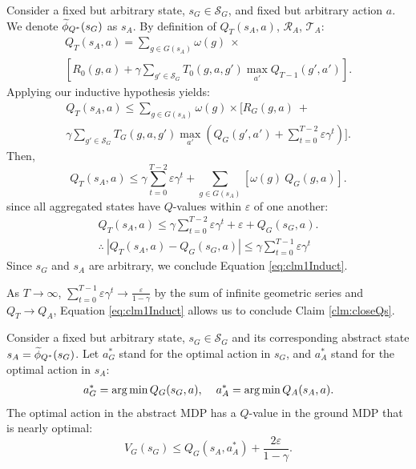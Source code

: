 Consider a fixed but arbitrary state, $s_G \in \mathcal{S}_G$, and fixed but arbitrary action $a$.
We denote $\widetilde \phi_{Q^*}(s_G)$ as $s_A$. 
By definition of $Q_{T}(s_A, a)$, $\mathcal{R}_A$, $\mathcal{T}_A$:
\begin{multline*}
Q_T(s_A, a) = \sum_{g \in G(s_A)}\omega(g)\ \times \\ 
 \left[ R_0(g,a) + \gamma \sum_{g' \in \mathcal{S}_G} T_0(g,a,g') \max_{a'} Q_{T-1}(g', a')      \right].
\end{multline*}
Applying our inductive hypothesis yields:
\begin{multline*}
Q_T(s_A, a) \leq \sum_{g \in G(s_A)}\omega(g) \times \biggl[ R_G(g,a)\ + \\ \gamma \sum_{g' \in \mathcal{S}_G} T_G(g,a,g') \max_{a'}(Q_G(g', a') + \sum_{t=0}^{T-2} \varepsilon \gamma^t) \biggr].
\end{multline*}
Then,
\begin{equation*}
Q_T(s_A, a) \leq \gamma\sum_{t=0}^{T-2} \varepsilon \gamma^t + \sum_{g \in G(s_A)}\left[ \omega(g)\ Q_G(g,a)\right].
\end{equation*}
since all aggregated states have $Q$-values within $\varepsilon$ of one another:
\begin{align*}
Q_T(s_A, a) \leq \gamma\sum_{t=0}^{T-2} \varepsilon \gamma^t + \varepsilon + Q_G(s_G, a). \\
\therefore\ \left| Q_{T}(s_A, a) - Q_G(s_G,a) \right| \leq \gamma\sum_{t=0}^{T-1}\varepsilon \gamma^t
\end{align*}
Since $s_G$ and $s_A$ are arbitrary, we conclude Equation \ref{eq:clm1Induct}.

As $T \rightarrow \infty$, $\sum_{t=0}^{T-1} \varepsilon \gamma^t \rightarrow \frac{\varepsilon}{1-\gamma}$ by the sum of infinite geometric series and $Q_T \rightarrow Q_A$, Equation \ref{eq:clm1Induct} allows us to conclude Claim \ref{clm:closeQs}.\\

\begin{clm}
\label{clm:optAbsActionNearOptGround}

Consider a fixed but arbitrary state, $s_G \in \mathcal{S}_G$ and its corresponding abstract state $s_A=\widetilde \phi_{Q^*}(s_G)$.
Let $a^*_G$ stand for the optimal action in $s_G$, and $a^*_A$ stand for the optimal action in $s_A$:
\begin{align*}
a^*_G = \operatorname*{arg\,min} Q_G(s_G, a), \hspace{4mm}
a^*_A = \operatorname*{arg\,min} Q_A(s_A, a).
\end{align*}
The optimal action in the abstract MDP has a $Q$-value in the ground MDP that is nearly optimal:
\begin{equation}
\label{eq:Q*Claim2}
V_G(s_G) \leq Q_G(s_A, a^*_A) + \frac{2\varepsilon}{1-\gamma}.
\end{equation}
\end{clm}

